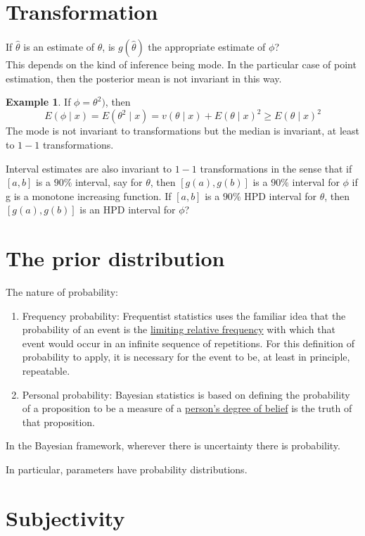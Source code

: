 \documentclass[lecture,12pt,]{pcms-l}
\numberwithin{section}{chapter}
\numberwithin{equation}{chapter}
\theoremstyle{plain}
\theoremstyle{definition}
\newtheorem{example}{Example}[section]
\theoremstyle{definition}
\begin{document}
\section{Transformation}
If $\hat{\theta}$ is an estimate of $\theta$, is $g(\hat{\theta})$ the appropriate estimate of $\phi$? 
\\
This depends on the kind of inference being mode. In the particular case of point estimation, then the posterior mean is not invariant in this way.
\begin{example}
If  $\phi = \theta^2)$, then 
\begin{equation}
E(\phi \mid x)=E(\theta^2 \mid x)=v(\theta \mid x)+ E(\theta \mid x)^2 \geq E( \theta \mid x)^2
\end{equation}
The mode is not invariant to transformations but the median is invariant, at least to $1-1$ transformations.
\end{example}
Interval estimates are also invariant to $1-1$ transformations in the sense that if $\left [ a, b \right ]$ is  a $90 \%$ interval, say for $\theta$, then $\left [ g(a), g(b) \right ]$ is a $90 \%$ interval for $\phi$ if g is a monotone increasing function. If $\left [ a, b \right ]$ is a $90 \%$ HPD interval for $\theta$, then $\left [ g(a), g(b) \right ]$ is an HPD interval for $\phi$?


\section{The prior distribution}
The nature of probability:
\begin{enumerate}
\item Frequency probability: Frequentist statistics uses the familiar idea that the probability of an event is the \underline{limiting relative frequency} with which that event would occur in an infinite sequence of repetitions. For this definition of probability to apply, it is necessary for the event to be, at least in principle, repeatable.
\item Personal probability: Bayesian statistics is based on defining the probability of a proposition to be a measure  of a \underline{person's degree of belief} is the truth of that proposition.
\end{enumerate}

In the Bayesian framework, wherever there is uncertainty there is probability.

In particular, parameters have probability distributions.
\section{Subjectivity}
\end{document}
